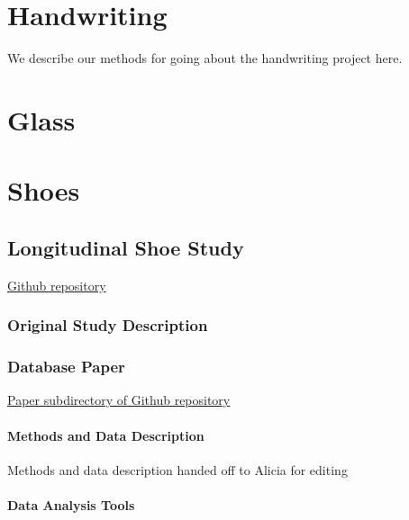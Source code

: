 \documentclass[]{book}
\begin{document}
\hypertarget{handwriting}{%
\chapter{Handwriting}\label{handwriting}}

We describe our methods for going about the handwriting project here.

\hypertarget{glass}{%
\chapter{Glass}\label{glass}}

\hypertarget{shoes}{%
\chapter{Shoes}\label{shoes}}

\hypertarget{longitudinal}{%
\section{Longitudinal Shoe Study}\label{longitudinal}}

\href{https://github.com/CSAFE-ISU/Longitudinal_Shoe_Study}{Github repository}

\hypertarget{original-study-description}{%
\subsection{Original Study Description}\label{original-study-description}}

\hypertarget{database-paper}{%
\subsection{Database Paper}\label{database-paper}}

\href{https://github.com/CSAFE-ISU/Longitudinal_Shoe_Study/tree/master/Paper}{Paper subdirectory of Github repository}

\hypertarget{methods-and-data-description}{%
\subsubsection{Methods and Data Description}\label{methods-and-data-description}}

Methods and data description handed off to Alicia for editing

\hypertarget{data-analysis-tools}{%
\subsubsection{Data Analysis Tools}\label{data-analysis-tools}}
\end{document}
